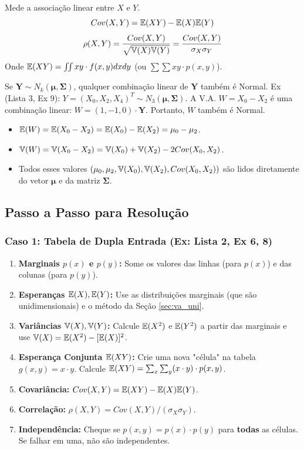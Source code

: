 \begin{definicao}
Mede a associação linear entre $X$ e $Y$.
$$ Cov(X,Y) = \mathbb{E}(XY) - \mathbb{E}(X)\mathbb{E}(Y) $$
$$ \rho(X,Y) = \frac{Cov(X,Y)}{\sqrt{\mathbb{V}(X)\mathbb{V}(Y)}} = \frac{Cov(X,Y)}{\sigma_X \sigma_Y} $$
Onde $\mathbb{E}(XY) = \iint xy \cdot f(x,y) dx dy$ (ou $\sum\sum xy \cdot p(x,y)$).
\end{definicao}

\begin{propriedade}
Se $\boldsymbol{Y} \sim N_k(\boldsymbol{\mu}, \boldsymbol{\Sigma})$, qualquer combinação linear de $\boldsymbol{Y}$ também é Normal.
Ex (Lista 3, Ex 9): $Y = (X_0, X_2, X_4)^T \sim N_3(\boldsymbol{\mu}, \boldsymbol{\Sigma})$.
A V.A. $W = X_0 - X_2$ é uma combinação linear: $W = (1, -1, 0) \cdot \boldsymbol{Y}$.
Portanto, $W$ também é Normal.
\begin{itemize}
    \item $\mathbb{E}(W) = \mathbb{E}(X_0 - X_2) = \mathbb{E}(X_0) - \mathbb{E}(X_2) = \mu_0 - \mu_2$.
    \item $\mathbb{V}(W) = \mathbb{V}(X_0 - X_2) = \mathbb{V}(X_0) + \mathbb{V}(X_2) - 2Cov(X_0, X_2)$.
    \item Todos esses valores $(\mu_0, \mu_2, \mathbb{V}(X_0), \mathbb{V}(X_2), Cov(X_0, X_2))$ são lidos diretamente do vetor $\boldsymbol{\mu}$ e da matriz $\boldsymbol{\Sigma}$.
\end{itemize}
\end{propriedade}

\subsection{Passo a Passo para Resolução}

\subsubsection{Caso 1: Tabela de Dupla Entrada (Ex: Lista 2, Ex 6, 8)}
\begin{enumerate}
    \item \textbf{Marginais $p(x)$ e $p(y)$:} Some os valores das linhas (para $p(x)$) e das colunas (para $p(y)$).
    \item \textbf{Esperanças $\mathbb{E}(X), \mathbb{E}(Y)$:} Use as distribuições marginais (que são unidimensionais) e o método da Seção \ref{sec:va_uni}.
    \item \textbf{Variâncias $\mathbb{V}(X), \mathbb{V}(Y)$:} Calcule $\mathbb{E}(X^2)$ e $\mathbb{E}(Y^2)$ a partir das marginais e use $\mathbb{V}(X) = \mathbb{E}(X^2) - [\mathbb{E}(X)]^2$.
    \item \textbf{Esperança Conjunta $\mathbb{E}(XY)$:} Crie uma nova "célula" na tabela $g(x,y) = x \cdot y$. Calcule $\mathbb{E}(XY) = \sum_{x} \sum_{y} (x \cdot y) \cdot p(x,y)$.
    \item \textbf{Covariância:} $Cov(X,Y) = \mathbb{E}(XY) - \mathbb{E}(X)\mathbb{E}(Y)$.
    \item \textbf{Correlação:} $\rho(X,Y) = Cov(X,Y) / (\sigma_X \sigma_Y)$.
    \item \textbf{Independência:} Cheque se $p(x,y) = p(x) \cdot p(y)$ para \textbf{todas} as células. Se falhar em uma, não são independentes.
\end{enumerate}

